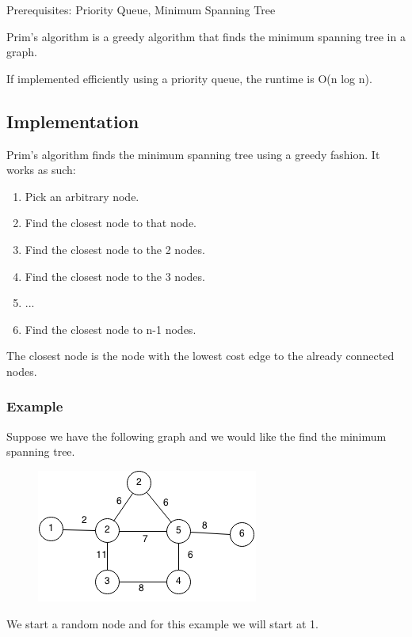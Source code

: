 \documentclass[11pt,oneside]{book}
\makeatletter
\def\maxwidth#1{\ifdim\Gin@nat@width>#1 #1\else\Gin@nat@width\fi}
\makeatother
\begin{document}
Prerequisites:  Priority Queue, Minimum Spanning Tree

Prim's algorithm is a greedy algorithm that finds the minimum spanning tree in a graph.

If implemented efficiently using a priority queue, the runtime is O(n log n).

\subsection{Implementation}

Prim's algorithm finds the minimum spanning tree using a greedy fashion. It works as such:

\begin{enumerate}
\item Pick an arbitrary node.
\item Find the closest node to that node.
\item Find the closest node to the 2 nodes.
\item Find the closest node to the 3 nodes.
\item ...
\item Find the closest node to n-1 nodes.
\end{enumerate}

The closest node is the node with the lowest cost edge to the already connected nodes.

\subsubsection{Example}

Suppose we have the following graph and we would like the find the minimum spanning tree.

\vspace{5px}\begin{figure}[H]\centering
        \includegraphics[width=0.66\maxwidth{\textwidth}]{prim.png}
        \end{figure}

We start a random node and for this example we will start at 1.
\end{document}

